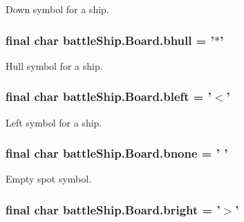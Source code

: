 Down symbol for a ship. 

\hypertarget{classbattleShip_1_1Board_a73ed34c95d608cdb748ff950841307d7}{
\subsubsection[{bhull}]{\setlength{\rightskip}{0pt plus 5cm}final char battle\-Ship.\-Board.\-bhull = '$\ast$'\hspace{0.3cm}{\ttfamily [static]}}}\label{classbattleShip_1_1Board_a73ed34c95d608cdb748ff950841307d7}


Hull symbol for a ship. 

\hypertarget{classbattleShip_1_1Board_a6db9e34520009f40729eb730ee6cb509}{
\subsubsection[{bleft}]{\setlength{\rightskip}{0pt plus 5cm}final char battle\-Ship.\-Board.\-bleft = '$<$'\hspace{0.3cm}{\ttfamily [static]}}}\label{classbattleShip_1_1Board_a6db9e34520009f40729eb730ee6cb509}


Left symbol for a ship. 

\hypertarget{classbattleShip_1_1Board_ae9d384309243340b7daf402ab99175df}{
\subsubsection[{bnone}]{\setlength{\rightskip}{0pt plus 5cm}final char battle\-Ship.\-Board.\-bnone = ' '\hspace{0.3cm}{\ttfamily [static]}}}\label{classbattleShip_1_1Board_ae9d384309243340b7daf402ab99175df}


Empty spot symbol. 

\hypertarget{classbattleShip_1_1Board_a9d97dd87cddd014a15af04801920d50e}{
\subsubsection[{bright}]{\setlength{\rightskip}{0pt plus 5cm}final char battle\-Ship.\-Board.\-bright = '$>$'\hspace{0.3cm}{\ttfamily [static]}}}\label{classbattleShip_1_1Board_a9d97dd87cddd014a15af04801920d50e}


